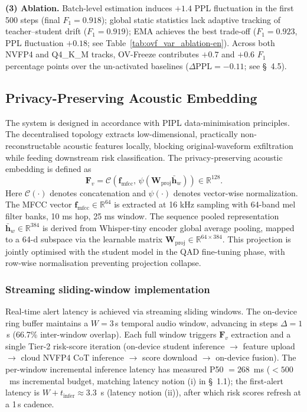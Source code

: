 \documentclass[11pt, a4paper]{article}
\begin{document}
\textbf{(3) Ablation.} Batch-level estimation induces $+1.4$ PPL fluctuation in the first 500 steps (final $F_1 = 0.918$); global static statistics lack adaptive tracking of teacher--student drift ($F_1 = 0.919$); EMA achieves the best trade-off ($F_1 = 0.923$, PPL fluctuation $+0.18$; see Table~\ref{tab:ovf_var_ablation-en}). Across both NVFP4 and Q4\_K\_M tracks, OV-Freeze contributes $+0.7$ and $+0.6$ $F_1$ percentage points over the un-activated baselines ($\Delta\text{PPL}=-0.11$; see \S~4.5).

\subsection{Privacy-Preserving Acoustic Embedding}

The system is designed in accordance with PIPL data-minimisation principles. The decentralised topology extracts low-dimensional, practically non-reconstructable acoustic features locally, blocking original-waveform exfiltration while feeding downstream risk classification. The privacy-preserving acoustic embedding is defined as
\begin{equation}
\bm{F}_v = \mathcal{C}\!\left(\bm{f}_{\mathrm{mfcc}},\,\psi(\bm{W}_{\mathrm{proj}}\bar{\bm{h}}_w)\right)\in\mathbb{R}^{128}.
\end{equation}
Here $\mathcal{C}(\cdot)$ denotes concatenation and $\psi(\cdot)$ denotes vector-wise normalization. The MFCC vector $\bm{f}_{\mathrm{mfcc}}\in\mathbb{R}^{64}$ is extracted at 16 kHz sampling with 64-band mel filter banks, 10 ms hop, 25 ms window. The sequence pooled representation $\bar{\bm{h}}_w\in\mathbb{R}^{384}$ is derived from Whisper-tiny encoder global average pooling, mapped to a 64-d subspace via the learnable matrix $\bm{W}_{\mathrm{proj}}\in\mathbb{R}^{64\times 384}$. This projection is jointly optimised with the student model in the QAD fine-tuning phase, with row-wise normalisation preventing projection collapse.

\subsubsection{Streaming sliding-window implementation}

Real-time alert latency is achieved via streaming sliding windows. The on-device ring buffer maintains a $W = 3$\,s temporal audio window, advancing in steps $\Delta = 1$\,s (66.7\% inter-window overlap). Each full window triggers $\bm{F}_v$ extraction and a single Tier-2 risk-score iteration (on-device student inference $\rightarrow$ feature upload $\rightarrow$ cloud NVFP4 CoT inference $\rightarrow$ score download $\rightarrow$ on-device fusion). The per-window incremental inference latency has measured P50 $=268$~ms ($<500$~ms incremental budget, matching latency notion (i) in \S~1.1); the first-alert latency is $W + t_{\mathrm{infer}}\approx 3.3$~s (latency notion (ii)), after which risk scores refresh at a 1\,s cadence.
\end{document}
